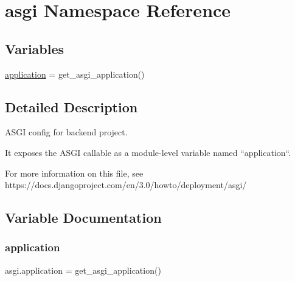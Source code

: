 \hypertarget{namespaceasgi}{}\section{asgi Namespace Reference}
\label{namespaceasgi}
\subsection*{Variables}
\begin{DoxyCompactItemize}
\item 
\hyperlink{namespaceasgi_af8d10139b00655cd91b1d3cfd2dcbb02}{application} = get\+\_\+asgi\+\_\+application()
\end{DoxyCompactItemize}


\subsection{Detailed Description}
\begin{DoxyVerb}ASGI config for backend project.

It exposes the ASGI callable as a module-level variable named ``application``.

For more information on this file, see
https://docs.djangoproject.com/en/3.0/howto/deployment/asgi/
\end{DoxyVerb}
 

\subsection{Variable Documentation}
\mbox{\label{namespaceasgi_af8d10139b00655cd91b1d3cfd2dcbb02}} 
\subsubsection{\texorpdfstring{application}{application}}
{\footnotesize\ttfamily asgi.\+application = get\+\_\+asgi\+\_\+application()}

